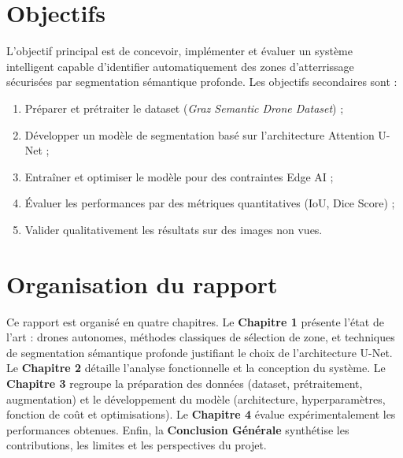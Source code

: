 \section*{Objectifs}

L'objectif principal est de concevoir, implémenter et évaluer un système intelligent capable d'identifier automatiquement des zones d'atterrissage sécurisées par segmentation sémantique profonde. Les objectifs secondaires sont :

\begin{enumerate}[leftmargin=2em, itemsep=4pt, label=\textbf{\arabic*.}]
  \item Préparer et prétraiter le dataset (\textit{Graz Semantic Drone Dataset}) ;
  \item Développer un modèle de segmentation basé sur l'architecture Attention U-Net ;
  \item Entraîner et optimiser le modèle pour des contraintes Edge AI ;
  \item Évaluer les performances par des métriques quantitatives (IoU, Dice Score) ;
  \item Valider qualitativement les résultats sur des images non vues.
\end{enumerate}

\section*{Organisation du rapport}

Ce rapport est organisé en quatre chapitres. Le \textbf{Chapitre 1} présente l'état de l'art : drones autonomes, méthodes classiques de sélection de zone, et techniques de segmentation sémantique profonde justifiant le choix de l'architecture U-Net. Le \textbf{Chapitre 2} détaille l'analyse fonctionnelle et la conception du système. Le \textbf{Chapitre 3} regroupe la préparation des données (dataset, prétraitement, augmentation) et le développement du modèle (architecture, hyperparamètres, fonction de coût et optimisations). Le \textbf{Chapitre 4} évalue expérimentalement les performances obtenues. Enfin, la \textbf{Conclusion Générale} synthétise les contributions, les limites et les perspectives du projet.

\clearpage

